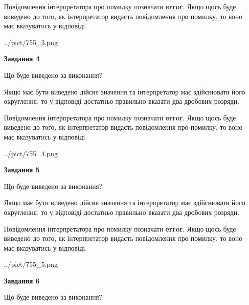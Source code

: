\documentclass[12pt, ukrainian]{article}
\begin{document}
{\begin {Large}
Повідомлення інтерпретатора про помилку позначати \textbf{error}.
Якщо щось буде виведено до того, як інтерпретатор видасть повідомлення про помилку, 
то воно має вказуватись у відповіді. \par

\begin{center}
	{../pict/755_3.png}
\end{center}
\newpage

{\begin {center}\textbf{Завдання 4}\end {center}}\par
Що буде виведено за виконання? \par

Якщо має бути виведено дійсне значення та інтерпретатор має здійснювати його округлення, 
то у відповіді достатньо правильно вказати два дробових розряди.

Повідомлення інтерпретатора про помилку позначати \textbf{error}.
Якщо щось буде виведено до того, як інтерпретатор видасть повідомлення про помилку, 
то воно має вказуватись у відповіді. \par

\begin{center}
	{../pict/755_4.png}
\end{center}
\newpage

{\begin {center}\textbf{Завдання 5}\end {center}}\par
Що буде виведено за виконання? \par

Якщо має бути виведено дійсне значення та інтерпретатор має здійснювати його округлення, 
то у відповіді достатньо правильно вказати два дробових розряди.

Повідомлення інтерпретатора про помилку позначати \textbf{error}.
Якщо щось буде виведено до того, як інтерпретатор видасть повідомлення про помилку, 
то воно має вказуватись у відповіді. \par

\begin{center}
	{../pict/755_5.png}
\end{center}
\newpage

{\begin {center}\textbf{Завдання 6}\end {center}}\par
Що буде виведено за виконання? \par


\end{Large}}
\end{document}
